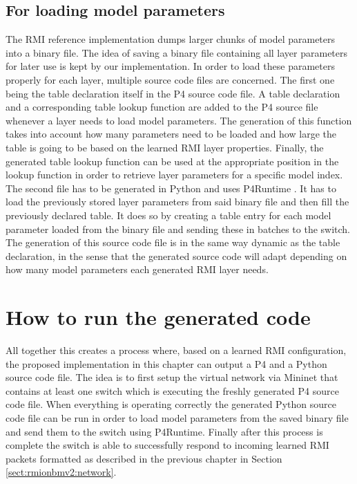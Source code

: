 \subsection{For loading model parameters}
\label{sect:rmiforp4:parameters}
The RMI reference implementation dumps larger chunks of model parameters into a binary file. The idea of saving a binary file containing all layer parameters for later use is kept by our implementation. In order to load these parameters properly for each layer, multiple source code files are concerned. The first one being the table declaration itself in the P4 source code file. A table declaration and a corresponding table lookup function are added to the P4 source file whenever a layer needs to load model parameters. The generation of this function takes into account how many parameters need to be loaded and how large the table is going to be based on the learned RMI layer properties. Finally, the generated table lookup function can be used at the appropriate position in the lookup function in order to retrieve layer parameters for a specific model index. The second file has to be generated in Python and uses P4Runtime \cite{p4runtime-spec}. It has to load the previously stored layer parameters from said binary file and then fill the previously declared table. It does so by creating a table entry for each model parameter loaded from the binary file and sending these in batches to the switch. The generation of this source code file is in the same way dynamic as the table declaration, in the sense that the generated source code will adapt depending on how many model parameters each generated RMI layer needs.

\section{How to run the generated code}
All together this creates a process where, based on a learned RMI configuration, the proposed implementation in this chapter can output a P4 and a Python source code file. The idea is to first setup the virtual network via Mininet that contains at least one switch which is executing the freshly generated P4 source code file. When everything is operating correctly the generated Python source code file can be run in order to load model parameters from the saved binary file and send them to the switch using P4Runtime. Finally after this process is complete the switch is able to successfully respond to incoming learned RMI packets formatted as described in the previous chapter in Section \ref{sect:rmionbmv2:network}.

